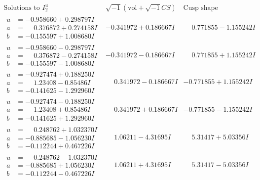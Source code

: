 \documentclass[1p]{elsarticle_modified}
\theoremstyle{definition}
\newcommand{\I}{\sqrt{-1}}
\begin{document}
$$\begin{array}{c|c|c}  
\text{Solutions to }I^u_{2}& \I (\text{vol} + \sqrt{-1}CS) & \text{Cusp shape}\\
 \hline 
\begin{aligned}
u &= -0.958660 + 0.298797 I \\
a &= \phantom{-}0.376872 + 0.274158 I \\
b &= -0.155597 + 1.008680 I\end{aligned}
 & -0.341972 + 0.186667 I & \phantom{-}0.771855 - 1.155242 I \\ \hline\begin{aligned}
u &= -0.958660 - 0.298797 I \\
a &= \phantom{-}0.376872 - 0.274158 I \\
b &= -0.155597 - 1.008680 I\end{aligned}
 & -0.341972 - 0.186667 I & \phantom{-}0.771855 + 1.155242 I \\ \hline\begin{aligned}
u &= -0.927474 + 0.188250 I \\
a &= \phantom{-}1.23408 - 0.85486 I \\
b &= -0.141625 - 1.292960 I\end{aligned}
 & \phantom{-}0.341972 - 0.186667 I & -0.771855 + 1.155242 I \\ \hline\begin{aligned}
u &= -0.927474 - 0.188250 I \\
a &= \phantom{-}1.23408 + 0.85486 I \\
b &= -0.141625 + 1.292960 I\end{aligned}
 & \phantom{-}0.341972 + 0.186667 I & -0.771855 - 1.155242 I \\ \hline\begin{aligned}
u &= \phantom{-}0.248762 + 1.032370 I \\
a &= -0.885685 - 1.056230 I \\
b &= -0.112244 + 0.467226 I\end{aligned}
 & \phantom{-}1.06211 - 4.31695 I & \phantom{-}5.31417 + 5.03356 I \\ \hline\begin{aligned}
u &= \phantom{-}0.248762 - 1.032370 I \\
a &= -0.885685 + 1.056230 I \\
b &= -0.112244 - 0.467226 I\end{aligned}
 & \phantom{-}1.06211 + 4.31695 I & \phantom{-}5.31417 - 5.03356 I \\ \hline\begin{aligned}

\end{aligned}
\end{array}$$
\end{document}
